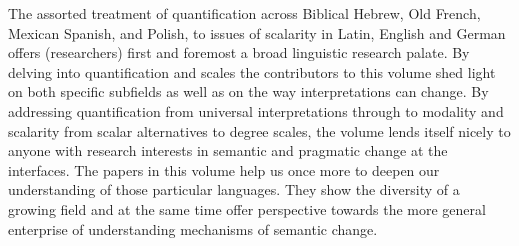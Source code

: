 \documentclass[output=paper]{langsci/langscibook}
\begin{document}
The assorted treatment of quantification across Biblical Hebrew, Old French, Mexican Spanish, and Polish, to issues of scalarity in Latin, English and German offers (researchers) first and foremost a broad linguistic research palate. By delving into quantification and scales the contributors to this volume shed light on both specific subfields as well as on the way interpretations can change.  By addressing quantification from universal interpretations through to modality and scalarity from scalar alternatives to degree scales, the volume lends itself nicely to anyone with research interests in semantic and pragmatic change at the interfaces. The papers in this volume help us once more to deepen our understanding of those particular languages. They show the diversity of a growing field and at the same time offer perspective towards the more general enterprise of  understanding mechanisms of semantic change.

{\sloppy\printbibliography[heading=subbibliography,notkeyword=this]}
\end{document}
